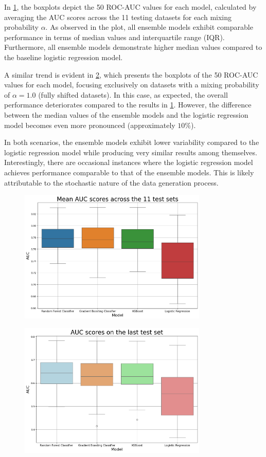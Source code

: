 In \cref{fig:mean-boxplot}, the boxplots depict the 50 ROC-AUC values for each model, calculated by averaging the AUC scores across the 11 testing datasets for each mixing probability $\alpha$. As observed in the plot, all ensemble models exhibit comparable performance in terms of median values and interquartile range (IQR). Furthermore, all ensemble models demonstrate higher median values compared to the baseline logistic regression model. 

A similar trend is evident in \cref{fig:boxplot}, which presents the boxplots of the 50 ROC-AUC values for each model, focusing exclusively on datasets with a mixing probability of $\alpha = 1.0$ (fully shifted datasets). In this case, as expected, the overall performance deteriorates compared to the results in \cref{fig:mean-boxplot}. However, the difference between the median values of the ensemble models and the logistic regression model becomes even more pronounced (approximately $10\%$). 

In both scenarios, the ensemble models exhibit lower variability compared to the logistic regression model while producing very similar results among themselves. Interestingly, there are occasional instances where the logistic regression model achieves performance comparable to that of the ensemble models. This is likely attributable to the stochastic nature of the data generation process.

\vspace {2em}

\begin{figure}[H]
	\centering
	\includegraphics[width=0.8\textwidth]{assets/mean_boxplot.png} 
	\caption{\textbf{}}
	\label{fig:mean-boxplot}
\end{figure}

\vspace {2em}

\begin{figure}[H]
    \centering
    \includegraphics[width=0.8\textwidth]{assets/boxplot.png} 
    \caption{\textbf{}}
    \label{fig:boxplot}
\end{figure}


